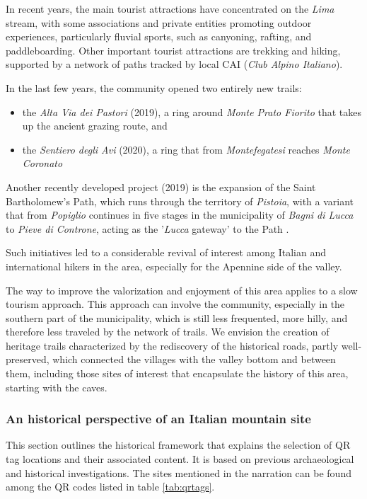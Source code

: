 \documentclass[sustainability,article,submit,pdftex,moreauthors]{Definitions/mdpi}
\begin{document}
In recent years, the main tourist attractions have concentrated on the \emph{Lima} stream, with some associations and private entities promoting outdoor experiences, particularly fluvial sports, such as canyoning, rafting, and paddleboarding. Other important tourist attractions are trekking and hiking, supported by a network of paths tracked by local CAI (\textit{Club Alpino Italiano}).

In the last few years, the community opened two entirely new trails:
\begin{itemize}
	\item the \textit{Alta Via dei Pastori} (2019), a ring around \textit{Monte Prato Fiorito} that takes up the ancient grazing route, and
	\item the \textit{Sentiero degli Avi} (2020), a ring that from \textit{Montefegatesi}
	reaches \textit{Monte Coronato} \cite{pin21}
\end{itemize}

Another recently developed project (2019) is the expansion of the Saint Bartholomew's Path, which runs through the territory of \textit{Pistoia}, with a
variant that from \textit{Popiglio} continues in five stages in the municipality of \emph{Bagni di Lucca} to \textit{Pieve di Controne}, acting as the '\emph{Lucca} gateway' to the Path .

Such initiatives led to a considerable revival of interest among Italian and international hikers in the area, especially for the Apennine side of the valley.

The way to improve the valorization and enjoyment of this area applies to a slow tourism approach. This approach can involve the community, especially in the southern part of the municipality, which is still less frequented, more hilly, and therefore less traveled by the network of trails. We envision the creation of heritage trails characterized by the rediscovery of the historical roads, partly well-preserved, which connected the villages with the valley bottom and between them, including those sites of interest that encapsulate the history of this area, starting with the caves.

\subsubsection{An historical perspective of an Italian mountain site}

This section outlines the historical framework that explains the selection of QR tag locations and their associated content. It is based on previous archaeological and historical investigations. The sites mentioned in the narration can be found among the QR codes listed in table \ref{tab:qrtags}.
\end{document}
